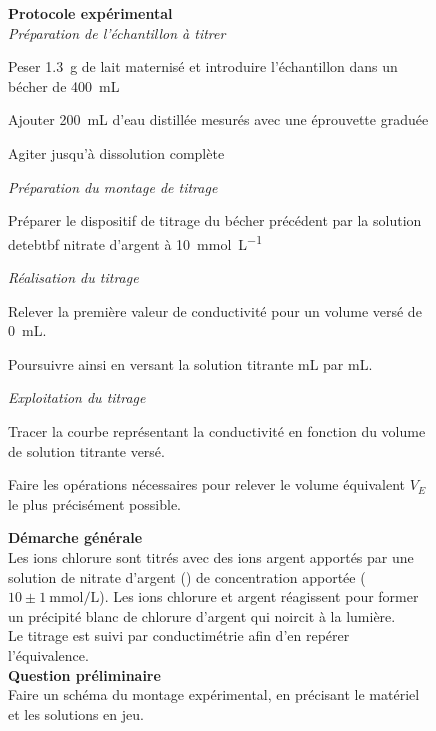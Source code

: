 \documentclass[a4paper,11pt,fleqn]{article}%
\begin{document}
\begin{figure}[h!]
	\begin{minipage}{.48\linewidth}
		\textbf{Protocole expérimental}\\
		\textit{Préparation de l’échantillon à titrer}
		\begin{itemize*}
			\item Peser \SI{1,3}{g} de lait maternisé et introduire l’échantillon dans un bécher de \SI{400}{mL}
			\item Ajouter \SI{200}{mL} d’eau distillée mesurés avec une éprouvette graduée
			\item Agiter jusqu’à dissolution complète
		\end{itemize*}

		\textit{Préparation du montage de titrage}
		\begin{itemize*}
			\item Préparer le dispositif de titrage du bécher précédent par la solution detebtbf nitrate d’argent à \SI{10}{\milli\mole\per\liter}
		\end{itemize*}
		
		\textit{Réalisation du titrage}
		\begin{itemize*}
			\item Relever la première valeur de conductivité pour un volume versé de \SI{0}{mL}.
			\item Poursuivre ainsi en versant la solution titrante \unit{mL} par \unit{mL}.
		\end{itemize*}

		\textit{Exploitation du titrage}
		\begin{itemize*}
			\item Tracer la courbe représentant la conductivité en fonction du volume de solution titrante versé.
			\item Faire les opérations nécessaires pour relever le volume équivalent $V_E$ le plus précisément possible.
		\end{itemize*}
	\end{minipage}\hspace{.02\linewidth}
	\begin{minipage}{.48\linewidth}
		\textbf{Démarche générale}\\
		Les ions chlorure sont titrés avec des ions argent apportés par une solution de nitrate d’argent () de concentration apportée ($10 \pm \SI{1}{\milli\mole\per\liter}$). Les ions chlorure et argent réagissent pour former un précipité blanc de chlorure d’argent  qui noircit à la lumière.\\
		Le titrage est suivi par conductimétrie afin d’en repérer l’équivalence.\\
		\textbf{Question préliminaire}\\
		Faire un schéma du montage expérimental, en précisant le matériel et les solutions en jeu.
	\end{minipage}
\end{figure}
\end{document}
